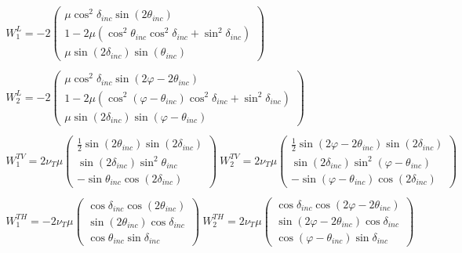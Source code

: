 \begin{eqnarray}
\begin{array}{lr}
W_1^L=-2\begin{pmatrix}
\mu\cos^2\delta_{inc}\sin(2\theta_{inc}) \\
1-2\mu(\cos^2\theta_{inc}\cos^2\delta_{inc}+\sin^2\delta_{inc})\\
\mu\sin(2\delta_{inc})\sin(\theta_{inc})
\end{pmatrix}\\
~\\
 W_2^L=-2\begin{pmatrix}
\mu\cos^2\delta_{inc}\sin(2\varphi-2\theta_{inc}) \\
1-2\mu(\cos^2(\varphi-\theta_{inc})\cos^2\delta_{inc}+\sin^2\delta_{inc})\\
\mu\sin(2\delta_{inc})\sin(\varphi-\theta_{inc})
\end{pmatrix}\\ 
~\\
W_1^{TV}=2\nu_T\mu\begin{pmatrix}
\frac{1}{2}\sin(2\theta_{inc})\sin(2\delta_{inc})
\\
\sin(2\delta_{inc})\sin^2\theta_{inc}\\
-\sin\theta_{inc}\cos(2\delta_{inc})
\end{pmatrix}~
W_2^{TV}=2\nu_T\mu\begin{pmatrix}
\frac{1}{2}\sin(2\varphi-2\theta_{inc})\sin(2\delta_{inc})
\\
\sin(2\delta_{inc})\sin^2(\varphi-\theta_{inc})\\
-\sin(\varphi-\theta_{inc})\cos(2\delta_{inc})
\end{pmatrix} \\
~
\\
W_1^{TH}=-2 \nu_T\mu \begin{pmatrix}
\cos\delta_{inc}\cos(2\theta_{inc})
\\
\sin(2\theta_{inc})\cos\delta_{inc}\\
\cos\theta_{inc}\sin\delta_{inc}
\end{pmatrix}
~
W_2^{TH}=2 \nu_T\mu \begin{pmatrix}
\cos\delta_{inc}\cos(2\varphi-2\theta_{inc})\\
\sin(2\varphi-2\theta_{inc})\cos\delta_{inc}\\
\cos(\varphi-\theta_{inc})\sin\delta_{inc}
\end{pmatrix}
\end{array}
\label{C4:Wj}
\end{eqnarray}

